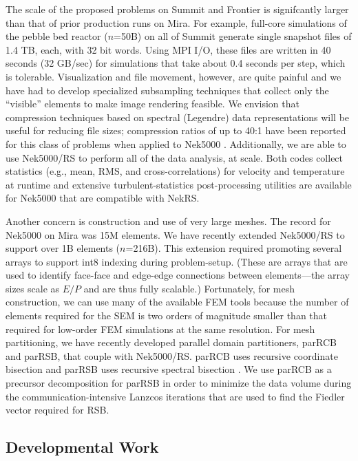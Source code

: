 The scale of the proposed problems on Summit and Frontier is signifcantly
larger than that of prior production runs on Mira.  For example, full-core
simulations of the pebble bed reactor  ($n$=50B) on all of Summit generate
single snapshot files of 1.4 TB, each, with 32 bit words.  Using MPI I/O, these
files are written in 40 seconds (32 GB/sec) for simulations that take about 0.4
seconds per step, which is tolerable.   Visualization and file movement,
however, are quite painful and we have had to develop specialized subsampling
techniques that collect only the ``visible'' elements to make image rendering
feasible.  We envision that compression techniques based on spectral (Legendre)
data representations will be useful for reducing file sizes; compression ratios
of up to 40:1 have been reported for this class of problems when applied to
Nek5000 \cite{otero18}.  Additionally, we are able to use Nek5000/RS to perform
all of the data analysis, at scale.  Both codes collect statistics (e.g., mean,
RMS, and cross-correlations) for velocity and temperature at runtime and
extensive turbulent-statistics post-processing utilities are available for
Nek5000 that are compatible with NekRS. 

Another concern is construction and use of very large meshes.  The record
for Nek5000 on Mira was 15M elements.  We have recently extended Nek5000/RS
to support over 1B elements ($n$=216B).   This extension required promoting
several arrays to support int8 indexing during problem-setup.  (These
are arrays that are used to identify face-face and edge-edge connections
between elements---the array sizes scale as $E/P$ and are thus fully
scalable.)   Fortunately, for mesh construction, we can use many of the 
available FEM tools because the number of elements required for the SEM
is two orders of magnitude smaller than that required for low-order FEM 
simulations at the same resolution.
For mesh partitioning, we have recently developed parallel domain partitioners,
parRCB and parRSB, that couple with Nek5000/RS.  parRCB uses recursive
coordinate bisection and parRSB uses recursive spectral bisection
\cite{pothen90}.  We use parRCB as a precursor decomposition for parRSB in
order to minimize the data volume during the communication-intensive Lanzcos
iterations that are used to find the Fiedler vector required for RSB.



\vspace{-.25in}
\subsection{Developmental Work}
\vspace{-.2in}

